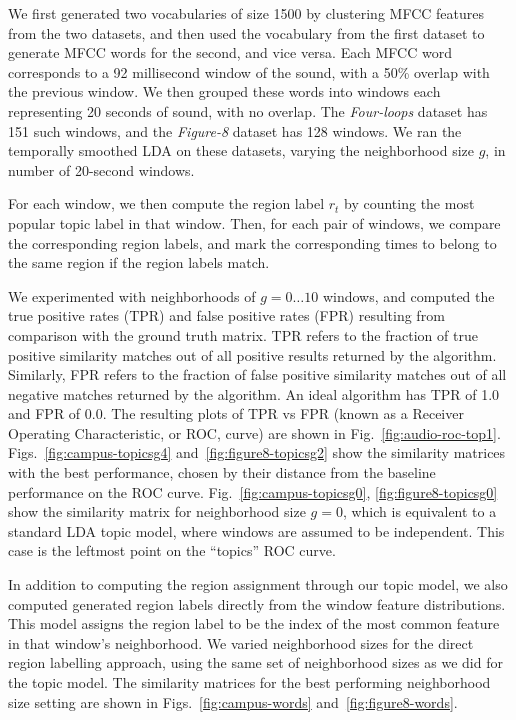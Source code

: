 We first generated two vocabularies of size 1500 by clustering MFCC features from the two datasets, and then used the vocabulary from the first dataset to generate MFCC words for the second, and vice versa. Each MFCC word corresponds to a 92 millisecond window of the sound, with a 50\% overlap with the previous window. We then grouped these words into windows each representing 20 seconds of sound, with no overlap. The \emph{Four-loops} dataset has 151 such windows, and the \emph{Figure-8} dataset has 128 windows. We ran the temporally smoothed LDA on these datasets, varying the neighborhood size $g$, in number of 20-second windows.

For each window, we then compute the region label $r_t$ by counting the most popular topic label in that window. Then, for each pair of windows, we compare the corresponding region labels, and mark the corresponding times to belong to the same region if the region labels match. 

We experimented with neighborhoods of $g=0 \ldots 10$ windows, and computed the true positive rates (TPR) and false positive rates (FPR) resulting from comparison with the ground truth matrix. TPR refers to the fraction of true positive similarity matches out of all positive results returned by the algorithm. Similarly, FPR refers to the fraction of false positive similarity matches out of all negative matches returned by the algorithm. An ideal algorithm has TPR of 1.0 and FPR of 0.0. The resulting plots of TPR vs FPR (known as a Receiver Operating Characteristic, or ROC, curve) are shown in Fig.~\ref{fig:audio-roc-top1}. Figs.~\ref{fig:campus-topicsg4} and~\ref{fig:figure8-topicsg2} show the similarity matrices with the best performance, chosen by their distance from the baseline performance on the ROC curve.  Fig.~\ref{fig:campus-topicsg0}, \ref{fig:figure8-topicsg0} show the similarity matrix for neighborhood size $g=0$, which is equivalent to a standard LDA topic model, where windows are assumed to be independent. This case is the leftmost point on the ``topics'' ROC curve. 

In addition to computing the region assignment through our topic model, we also computed generated region labels directly from the window feature distributions. This model assigns the region label to be the index of the most common feature in that window's neighborhood. We varied neighborhood sizes for the direct region labelling approach, using the same set of neighborhood sizes as we did for the topic model. The similarity matrices for the best performing neighborhood size setting are shown in Figs.~\ref{fig:campus-words} and~\ref{fig:figure8-words}.

